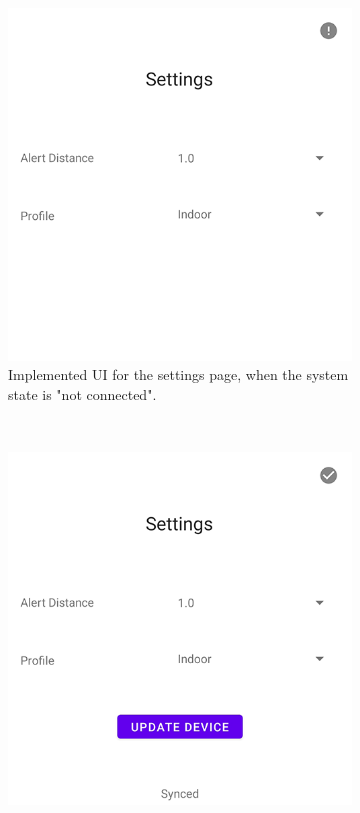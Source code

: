 \documentclass{l4proj}
\begin{document}
\begin{figure}[!htb]
    \centering
    \begin{subfigure}[b]{0.47\textwidth}
        \includegraphics[width=\textwidth]{images/settings_not_connected.png}
        \caption{ Implemented UI for the settings page, when the system state is "not connected". }
        \label{fig:settings_not_connected}
    \end{subfigure}
    ~
    \begin{subfigure}[b]{0.47\textwidth}
        \includegraphics[width=\textwidth]{images/settings_connection.png}

\end{subfigure}
\end{figure}
\end{document}
